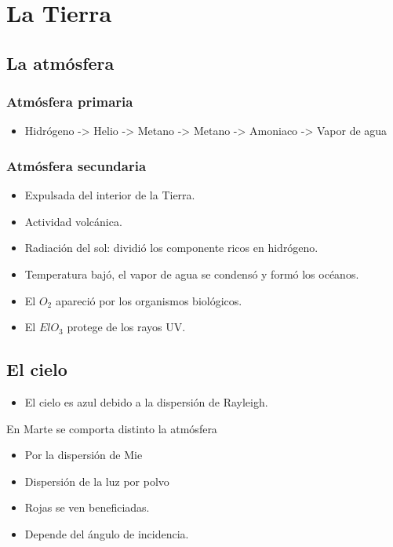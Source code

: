 \documentclass[11pt,fleqn]{book} %
\begin{document}
\section{La Tierra}

\subsection{La atmósfera}
\subsubsection{Atmósfera primaria}
\begin{itemize}
    \item Hidrógeno -> Helio -> Metano -> Metano -> Amoniaco -> Vapor de agua 
\end{itemize}
\subsubsection{Atmósfera secundaria}
\begin{itemize}
    \item Expulsada del interior de la Tierra. 
    \item Actividad volcánica. 
    \item Radiación del sol: dividió los componente ricos en hidrógeno.
    \item Temperatura bajó, el vapor de agua se condensó y formó los océanos. 
    \item El $O_2$ apareció por los organismos biológicos. 
    \item El $El O_3$ protege de los rayos UV.
\end{itemize}

\subsection{El cielo}
\begin{itemize}
    \item El cielo es azul debido a la dispersión de Rayleigh.
\end{itemize}

\begin{remark}
En Marte se comporta distinto la atmósfera
\begin{itemize}
    \item Por la dispersión de Mie
    \item Dispersión de la luz por polvo 
    \item Rojas se ven beneficiadas. 
    \item Depende del ángulo de incidencia. 
\end{itemize}
\end{remark}
\end{document}
